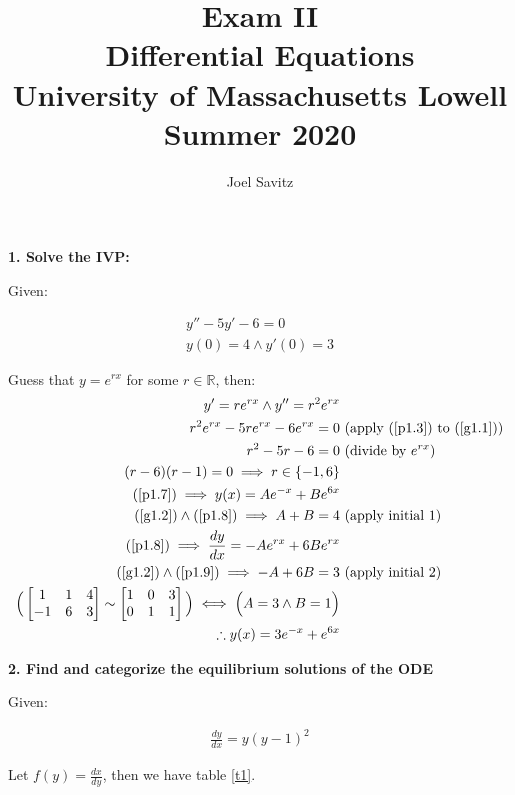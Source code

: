 \documentclass{article}
\title{Exam II \\
\small Differential Equations \\
University of Massachusetts Lowell \\
Summer 2020}
\author{Joel Savitz}
\newcommand{\reals}{\mathbb{R}}
\begin{document}
\maketitle

\textbf{1. Solve the IVP:}

Given:

\begin{align}
	\label{g1.1}
	y'' - 5y' -6 = 0 \\
	\label{g1.2}
	y(0) = 4 \land y'(0) = 3
\end{align}

Guess that $y = e^{rx}$ for some $r \in \reals$, then:
\begin{align}
	\label{p1.3}
	y' = re^{rx} \land y'' = r^2e^{rx} & \\
	r^2e^{rx}-5re^{rx}-6e^{rx} = 0 & \textrm{ (apply (\ref{p1.3}) to (\ref{g1.1})}) \\
	r^2-5r-6 = 0 & \textrm{ (divide by $e^{rx}$)} \\
	\label{p1.7}
	(r-6)(r-1) = 0 \implies r \in \{ -1, 6 \} & \\
	\label{p1.8}
	(\ref{p1.7}) \implies y(x) = Ae^{-x} + Be^{6x} \\
	(\ref{g1.2}) \land (\ref{p1.8}) \implies A + B = 4 & \textrm{ (apply initial 1)}\\
	\label{p1.9}
	(\ref{p1.8}) \implies \frac{dy}{dx} = -Ae^{rx} + 6Be^{rx} \\
	(\ref{g1.2}) \land (\ref{p1.9}) \implies -A + 6B = 3 & \textrm{ (apply initial 2)}\\
	\Big(\begin{bmatrix} 1 & 1 & 4 \\ -1 & 6 & 3 \end{bmatrix} \sim
	\begin{bmatrix} 1 & 0 & 3 \\ 0 & 1 & 1 \end{bmatrix} \Big)
	\iff \Big(A = 3 \land B = 1 \Big) \\
	\label{s1}
	\therefore y(x) = 3e^{-x} + e^{6x}
\end{align}

\medskip

\textbf{2. Find and categorize the equilibrium solutions of the ODE}

Given:

\begin{align}
	\label{g2}
	\frac{dy}{dx} = y(y - 1)^2
\end{align}

Let $f(y) = \frac{dx}{dy}$, then we have table \ref{t1}.
\end{document}
